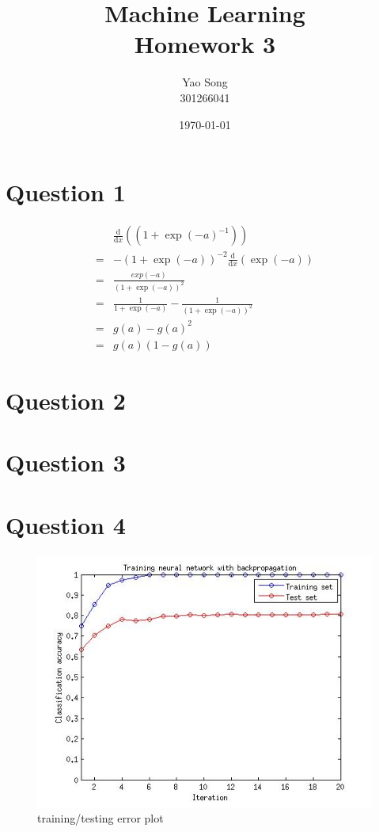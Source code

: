 \documentclass[paper=a4, fontsize=15pt]{article} %
\title{	
Machine Learning \\
Homework 3
}
\author{Yao Song\\301266041} %
\date{\normalsize\today} %
\begin{document}
\maketitle %

\section*{Question 1}
\begin{align}
&\frac{\mathrm d}{\mathrm d x} \left( (1+\exp(-a)^{-1}) \right) \\
=&-(1+\exp(-a))^{-2} \frac{\mathrm d}{\mathrm d x} \left( \exp(-a) \right)\\
=& \frac{exp(-a)}{(1+\exp(-a))^{2}}\\
=& \frac{1}{1+\exp(-a)} - \frac{1}{(1+\exp(-a))^{2}}\\
=& g(a) - g(a)^2\\
=& g(a)( 1- g(a) )
\end{align}


\section*{Question 2}



\section*{Question 3}




\section*{Question 4}
\begin{figure}[hb]
\includegraphics[width=\linewidth]{./a3_datacode/normal.jpg}
\caption{training/testing error plot}
\label{fig:normal}
\end{figure}






\end{document}
